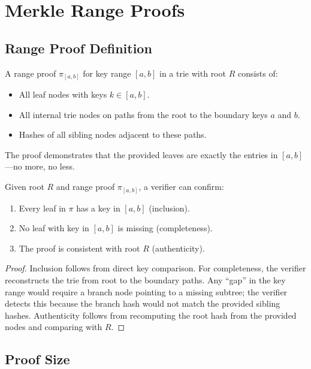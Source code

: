 \section{Merkle Range Proofs}
\label{sec:rangeproofs}

\subsection{Range Proof Definition}

\begin{definition}
A range proof $\pi_{[a,b]}$ for key range $[a, b]$ in a trie with root $R$ consists of:
\begin{itemize}
    \item All leaf nodes with keys $k \in [a, b]$.
    \item All internal trie nodes on paths from the root to the boundary keys $a$ and $b$.
    \item Hashes of all sibling nodes adjacent to these paths.
\end{itemize}
The proof demonstrates that the provided leaves are exactly the entries in $[a, b]$---no more, no less.
\end{definition}

\begin{theorem}
Given root $R$ and range proof $\pi_{[a,b]}$, a verifier can confirm:
\begin{enumerate}
    \item Every leaf in $\pi$ has a key in $[a, b]$ (inclusion).
    \item No leaf with key in $[a, b]$ is missing (completeness).
    \item The proof is consistent with root $R$ (authenticity).
\end{enumerate}
\end{theorem}

\begin{proof}
Inclusion follows from direct key comparison. For completeness, the verifier reconstructs the trie from root to the boundary paths. Any ``gap'' in the key range would require a branch node pointing to a missing subtree; the verifier detects this because the branch hash would not match the provided sibling hashes. Authenticity follows from recomputing the root hash from the provided nodes and comparing with $R$.
\end{proof}

\subsection{Proof Size}

